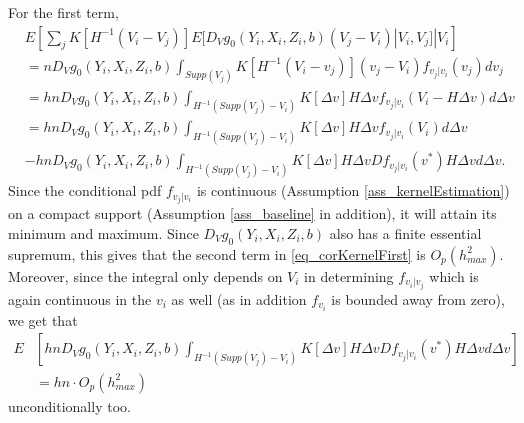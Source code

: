 \documentclass{article}
\theoremstyle{definition}
\theoremstyle{remark}
\begin{document}
For the first term,
\begin{align} \label{eq_corKernelFirst}
&E\left[\sum_j K[H^{-1}(V_i-V_j)]E[D_V g_0(Y_i, X_i, Z_i, b)(V_j-V_i)|V_i,V_j]|V_i\right] \\
&=n D_V g_0(Y_i, X_i, Z_i, b)\int_{Supp(V_j)} K[H^{-1}(V_i-v_j)] (v_j-V_i) f_{v_j|v_i}(v_j)dv_j \nonumber\\
&= hn D_V g_0(Y_i, X_i, Z_i, b)\int_{H^{-1} (Supp(V_j)-V_i)} K[\Delta v] H\Delta v f_{v_j|v_i}(V_i-H\Delta v)d\Delta v \nonumber \\
&= hn D_V g_0(Y_i, X_i, Z_i, b)\int_{H^{-1} (Supp(V_j)-V_i)} K[\Delta v] H\Delta v f_{v_j|v_i}(V_i)d\Delta v \nonumber \\
&- hn D_V g_0(Y_i, X_i, Z_i, b)\int_{H^{-1} (Supp(V_j)-V_i)} K[\Delta v] H\Delta v Df_{v_j|v_i}(v^*)H\Delta vd\Delta v. \nonumber
\end{align}
Since the conditional pdf $f_{v_j|v_i}$ is continuous (Assumption \ref{ass_kernelEstimation}) on a compact support (Assumption \ref{ass_baseline} in addition), it will attain its minimum and maximum. Since $D_V g_0(Y_i, X_i, Z_i, b)$ also has a finite essential supremum, this gives that the second term in \eqref{eq_corKernelFirst} is $O_p(h_{max}^2)$. Moreover, since the integral only depends on $V_i$ in determining $f_{v_i|v_j}$ which is again continuous in the $v_i$ as well (as in addition $f_{v_i}$ is bounded away from zero), we get that
\begin{align}
E&\left[hn D_V g_0(Y_i, X_i, Z_i, b)\int_{H^{-1} (Supp(V_j)-V_i)} K[\Delta v] H\Delta v Df_{v_j|v_i}(v^*)H\Delta vd\Delta v\right] \nonumber\\
&= hn \cdot O_p(h^2_{max})
\end{align}
unconditionally too.
\end{document}
